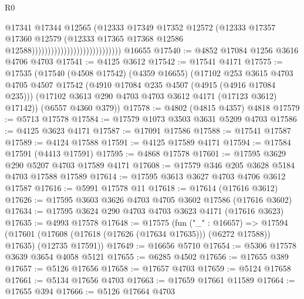 \begin{lexlean}{R0}
\begin{coremodule}
                                                      @17341
                                                      @17344
                                                      @12565
                                                      (@12333
                                                        @17349
                                                        @17352
                                                        @12572
                                                        (@12333
                                                          @17357
                                                          @17360
                                                          @12579
                                                          (@12333
                                                            @17365
                                                            @17368
                                                            @12586
                                                            @12588))))))))))))))))))))))))))))
    @16655
@17540 := @4852 @17084 @1256 @3616 @4706 @4703
@17541 := @4125 @3612
@17542 := @17541 @4171
@17575 := @17535
    (@17540
      (@4508 @17542)
      (@4359 @16655)
      (@17102
        @253
        @3615
        @4703
        @4705
        @4507
        @17542
        (@4910 @17084 @235 @4507 (@4915 (@4916 @17084 @235)))
        (@17102 @3613 @290 @4703 @4703 @3612 @4171 (@17123 @3612) @17142))
      (@6557 @4360 @379))
@17578 := @4802 (@4815 @4357) @4818
@17579 := @5713 @17578
@17584 := @17579 @1073 @3503 @3631 @5209 @4703
@17586 := @4125 @3623 @4171
@17587 := @17091 @17586
@17588 := @17541 @17587
@17589 := @4124 @17588
@17591 := @4125 @17589 @4171
@17594 := @17584 @17591 (@4413 @17591)
@17595 := @4868 @17578
@17601 := @17595 @3629 @290 @5207 @4703 @17589 @4171
@17608 := @17579 @346 @205 @3628 @5184 @4703 @17588 @17589
@17614 := @17595 @3613 @3627 @4703 @4706 @3612 @17587
@17616 := @5991 @17578 @11
@17618 := @17614 (@17616 @3612)
@17626 := @17595 @3603 @3626 @4703 @4705 @3602 @17586 (@17616 @3602)
@17634 := @17595 @3624 @290 @4703 @4703 @3623 @4171 (@17616 @3623)
@17635 := @4993 @17578
@17648 := @17575
    (fun ("_" : @16657) =>
    @17594
      (@17601 (@17608 (@17618 (@17626 (@17634 @17635))) (@6272 @17588)) @17635)
      (@12735 @17591))
@17649 := @16656 @5710
@17654 := @5306 @17578 @3639 @3654 @4058 @5121
@17655 := @6285 @4502
@17656 := @17655 @389
@17657 := @5126 @17656
@17658 := @17657 @4703
@17659 := @5124 @17658
@17661 := @5134 @17656 @4703
@17663 := @17659 @17661 @11589
@17664 := @17655 @394
@17666 := @5126 @17664 @4703

\end{coremodule}
\end{lexlean}
